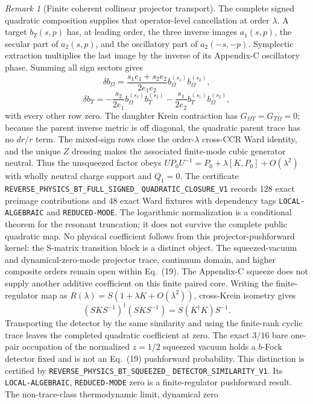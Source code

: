 \documentclass[11pt]{article}
\theoremstyle{definition}
\theoremstyle{remark}
\newtheorem{remark}[theorem]{Remark}
\begin{document}
\begin{remark}[Finite coherent collinear projector transport]
The complete signed quadratic composition supplies that operator-level
cancellation at order $\lambda$.  A target $b_\Upsilon(s,p)$ has, at leading
order, the three inverse images $a_1(s,p)$, the secular part of $a_2(s,p)$,
and the oscillatory part of $a_2(-s,-p)$.  Symplectic extraction multiplies
the last image by the inverse of its Appendix-C oscillatory phase.  Summing all
sign sectors gives
\[
 \delta b_\Omega=
 \frac{s_1e_1+s_2e_2}{2e_1e_2}
 b_\Omega^{(s_1)}b_\Omega^{(s_2)},
\]
\[
 \delta b_\Upsilon=-\frac{s_2}{2e_1}
 b_\Omega^{(s_1)}b_\Upsilon^{(s_2)}
 -\frac{s_1}{2e_2}
 b_\Upsilon^{(s_1)}b_\Omega^{(s_2)},
\]
with every other row zero.  The daughter Krein contraction has
$G_{\Omega\Upsilon}=G_{\Upsilon\Omega}=0$; because the parent inverse metric
is off diagonal, the quadratic parent trace has no $dr/r$ term.  The mixed-sign
rows close the order-$\lambda$ cross-CCR Ward identity, and the unique $Z$
dressing makes the associated finite-mode cubic generator neutral.  Thus the
unsqueezed factor obeys
$U P_0U^{-1}=P_0+\lambda[K,P_0]+O(\lambda^2)$ with wholly neutral charge
support and $Q_1=0$.  The
certificate
\texttt{REVERSE\_PHYSICS\_BT\_FULL\_SIGNED\_}
\allowbreak\texttt{QUADRATIC\_CLOSURE\_V1} records 128 exact preimage
contributions and 48 exact Ward fixtures with dependency tags
\texttt{LOCAL-ALGEBRAIC} and \texttt{REDUCED-MODE}.  The logarithmic
normalization is a conditional theorem for the resonant truncation; it does
not survive the complete public quadratic map.  No physical coefficient
follows from this projector-pushforward kernel: the S-matrix transition block
is a distinct object.  The squeezed-vacuum and dynamical-zero-mode projector
trace, continuum domain, and higher composite orders remain open within
Eq.~(19).
The Appendix-C squeeze does not supply another additive coefficient on this
finite paired core.  Writing the finite-regulator map as
$R(\lambda)=S(1+\lambda K+O(\lambda^2))$, cross-Krein isometry gives
\[
 (SKS^{-1})^\dagger(SKS^{-1})=S(K^\dagger K)S^{-1}.
\]
Transporting the detector by the same similarity and using the finite-rank
cyclic trace leaves the completed quadratic coefficient at zero.  The exact
$3/16$ bare one-pair occupation of the normalized $z=1/2$ squeezed vacuum
holds a $b$-Fock detector fixed and is not an Eq.~(19) pushforward probability.
This distinction is certified by
\texttt{REVERSE\_PHYSICS\_BT\_SQUEEZED\_}
\allowbreak\texttt{DETECTOR\_SIMILARITY\_V1}.  Its
\texttt{LOCAL-ALGEBRAIC}, \texttt{REDUCED-MODE} zero is a finite-regulator
pushforward result.  The non-trace-class thermodynamic limit, dynamical zero

\end{remark}
\end{document}

